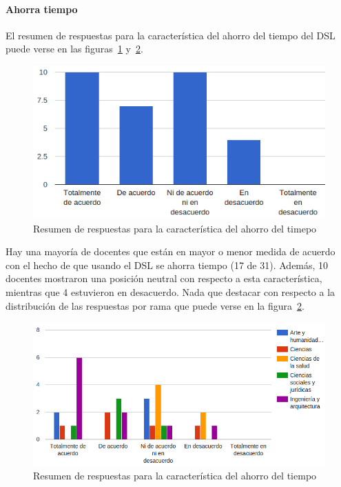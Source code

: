 \newpage
\paragraph*{Ahorra tiempo}

El resumen de respuestas para la característica del ahorro del tiempo del DSL puede verse en las figuras~\ref{fig:evalmetodo:dsl:ahorro} y~\ref{fig:evalmetodo:dsl:ahorro:rama}.

\begin{figure}[h]
  \begin{center}
    \includegraphics[scale=0.5]{C_DSL_ahorro.png}
  \end{center}
  \caption{Resumen de respuestas para la característica del ahorro del timepo}
  \label{fig:evalmetodo:dsl:ahorro}
\end{figure}

Hay una mayoría de docentes que están en mayor o menor medida de acuerdo con el hecho de que usando el DSL se ahorra tiempo (17 de 31). Además, 10 docentes mostraron una posición neutral con respecto a esta característica, mientras que 4 estuvieron en desacuerdo. Nada que destacar con respecto a la distribución de las respuestas por rama que puede verse en la figura~\ref{fig:evalmetodo:dsl:ahorro:rama}.

\begin{figure}[h]
  \begin{center}
    \includegraphics[scale=0.5]{C_DSL_ahorro_rama.png}
  \end{center}
  \caption{Resumen de respuestas para la característica del ahorro del tiempo}
  \label{fig:evalmetodo:dsl:ahorro:rama}
\end{figure}

